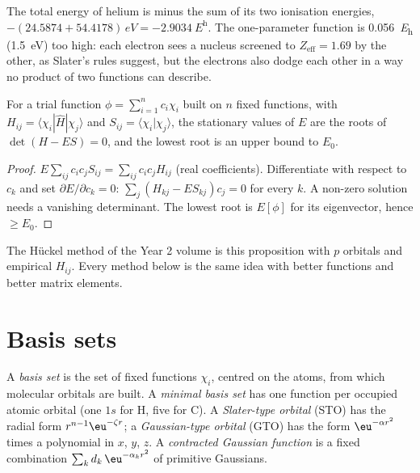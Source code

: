 \begin{example}\label{ex:b3:computational-chemistry:helium}
The total energy of helium is minus the sum of its two ionisation energies,
$-(24.5874 + 54.4178)\,\unit{eV} = \qty{-2.9034}{\hartree}$. The one-parameter
function is \qty{0.056}{\hartree} (\qty{1.5}{eV}) too high: each electron sees a
nucleus screened to $Z_{\mathrm{eff}} = 1.69$ by the other, as Slater's rules
suggest, but the electrons also dodge each other in a way no product of two
functions can describe.
\end{example}

\begin{proposition}\label{prop:b3:computational-chemistry:linear-variation}
For a trial function $\phi = \sum_{i=1}^n c_i\chi_i$ built on $n$ fixed functions,
with $H_{ij} = \langle\chi_i|\hat H|\chi_j\rangle$ and $S_{ij} = \langle\chi_i|\chi_j
\rangle$, the stationary values of $E$ are the roots of $\det(H - ES) = 0$, and
the lowest root is an upper bound to $E_0$.
\end{proposition}

\begin{proof}
$E\sum_{ij}c_ic_jS_{ij} = \sum_{ij}c_ic_jH_{ij}$ (real coefficients). Differentiate
with respect to $c_k$ and set $\partial E/\partial c_k = 0$: $\sum_j(H_{kj} -
ES_{kj})c_j = 0$ for every $k$. A non-zero solution needs a vanishing
determinant. The lowest root is $E[\phi]$ for its eigenvector, hence $\ge E_0$.
\end{proof}

The Hückel method of the Year 2 volume is this proposition with $p$
orbitals and empirical $H_{ij}$. Every method below is the same idea with
better functions and better matrix elements.

\section{Basis sets}

\begin{definition}\label{def:b3:computational-chemistry:basis}
A \emph{basis set} is the set of fixed functions $\chi_i$,
centred on the atoms, from which molecular orbitals are built. A
\emph{minimal basis set} has one function per
occupied atomic orbital (one $1s$ for H, five for C). A \emph{Slater-type
orbital} (STO) has the radial form
$r^{n-1}\eu^{-\zeta r}$; a \emph{Gaussian-type orbital} (GTO) has the form $\eu^{-\alpha r^2}$ times a polynomial in $x$, $y$,
$z$. A \emph{contracted Gaussian function}
is a fixed combination $\sum_kd_k\,\eu^{-\alpha_kr^2}$ of primitive Gaussians.
\end{definition}


